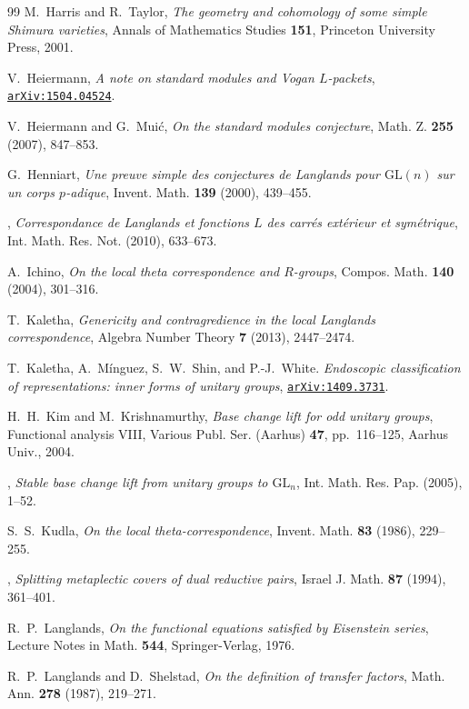 \documentclass[11pt]{amsart}
\numberwithin{equation}{section}
\theoremstyle{plain}
\theoremstyle{definition}
\theoremstyle{remark}
\begin{document}
\begin{thebibliography}{99}
M.~Harris and R.~Taylor,
\emph{The geometry and cohomology of some simple Shimura varieties},
Annals of Mathematics Studies \textbf{151}, Princeton University Press, 2001.

V.~Heiermann,
\emph{A note on standard modules and Vogan $L$-packets},
\href{http://arxiv.org/abs/1504.04524}{\texttt{arXiv:1504.04524}}.

V.~Heiermann and G.~Mui\'c,
\emph{On the standard modules conjecture}, 
Math. Z. \textbf{255} (2007), 847--853.

G.~Henniart,
\emph{Une preuve simple des conjectures de Langlands pour $\mathrm{GL}(n)$ sur un corps $p$-adique},
Invent. Math. \textbf{139} (2000), 439--455.

\bysame,
\emph{Correspondance de Langlands et fonctions $L$ des carr\'es ext\'erieur et sym\'etrique},
Int. Math. Res. Not. (2010), 633--673.

A.~Ichino,
\emph{On the local theta correspondence and $R$-groups},
Compos. Math. \textbf{140} (2004), 301--316.

T.~Kaletha,
\emph{Genericity and contragredience in the local Langlands correspondence},
Algebra Number Theory \textbf{7} (2013), 2447--2474.

T.~Kaletha, A.~M\'inguez, S.~W.~Shin, and P.-J.~White.
\emph{Endoscopic classification of representations: inner forms of unitary groups}, 
\href{http://arxiv.org/abs/1409.3731}{\texttt{arXiv:1409.3731}}.

H.~H.~Kim and M.~Krishnamurthy,
\emph{Base change lift for odd unitary groups},
Functional analysis VIII,
Various Publ. Ser. (Aarhus) \textbf{47}, pp.~116--125, Aarhus Univ., 2004.

\bysame,
\emph{Stable base change lift from unitary groups to $\mathrm{GL}_n$},
Int. Math. Res. Pap. (2005), 1--52.

S.~S.~Kudla,
\emph{On the local theta-correspondence},
Invent. Math. \textbf{83} (1986), 229--255.

\bysame,
\emph{Splitting metaplectic covers of dual reductive pairs},
Israel J. Math. \textbf{87} (1994), 361--401.

R.~P.~Langlands,
\emph{On the functional equations satisfied by Eisenstein series},
Lecture Notes in Math. \textbf{544}, Springer-Verlag, 1976.

R.~P.~Langlands and D.~Shelstad,
\emph{On the definition of transfer factors},
Math. Ann. \textbf{278} (1987), 219--271. 


\end{thebibliography}
\end{document}
